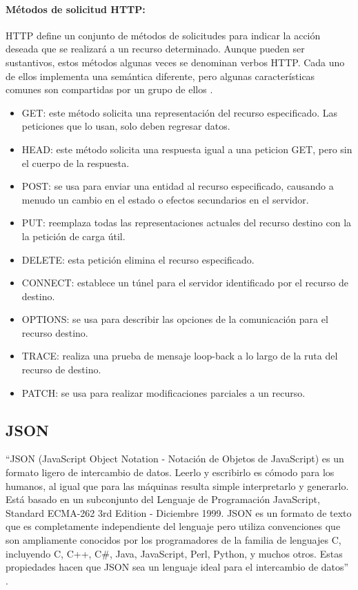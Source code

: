 \paragraph{Métodos de solicitud HTTP:}

HTTP define un conjunto de métodos de solicitudes para indicar la acción deseada que se realizará a un recurso determinado. Aunque pueden ser sustantivos, estos métodos algunas veces se denominan verbos HTTP. Cada uno de ellos implementa una semántica diferente, pero algunas características comunes son compartidas por un grupo de ellos \cite{HTTPM}.\\

\begin{itemize}
	\item GET: este método solicita una representación del recurso especificado. Las peticiones que lo usan, solo deben regresar datos.
	\item HEAD: este método solicita una respuesta igual a una peticion GET, pero sin el cuerpo de la respuesta.
	\item POST: se usa para enviar una entidad al recurso especificado, causando a menudo un cambio en el estado o efectos secundarios en el servidor.
	\item PUT: reemplaza todas las representaciones actuales del recurso destino con la la petición de carga útil.
	\item DELETE: esta petición elimina el recurso especificado.
	\item CONNECT: establece un túnel para el servidor identificado por el recurso de destino.
	\item OPTIONS: se usa para describir las opciones de la comunicación para el recurso destino.
	\item TRACE: realiza una prueba de mensaje loop-back a lo largo de la ruta del recurso de destino. 
	\item PATCH: se usa para realizar modificaciones parciales a un recurso.
\end{itemize}

\subsection{JSON}

``JSON (JavaScript Object Notation - Notación de Objetos de JavaScript) es un formato ligero de intercambio de datos. Leerlo y escribirlo es cómodo para los humanos, al igual que para las máquinas resulta simple interpretarlo y generarlo. Está basado en un subconjunto del Lenguaje de Programación JavaScript, Standard ECMA-262 3rd Edition - Diciembre 1999. JSON es un formato de texto que es completamente independiente del lenguaje pero utiliza convenciones que son ampliamente conocidos por los programadores de la familia de lenguajes C, incluyendo C, C++, C\#, Java, JavaScript, Perl, Python, y muchos otros. Estas propiedades hacen que JSON sea un lenguaje ideal para el intercambio de datos'' \cite{JSON}.\\


